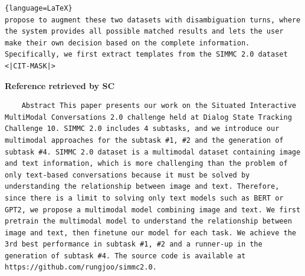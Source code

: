 \begin{lstlisting}{language=LaTeX}
propose to augment these two datasets with disambiguation turns, where the system provides all possible matched results and lets the user make their own decision based on the complete information. Specifically, we first extract templates from the SIMMC 2.0 dataset <|CIT-MASK|>
\end{lstlisting}

\textbf{Reference retrieved by SC}
\begin{lstlisting}
    Abstract This paper presents our work on the Situated Interactive MultiModal Conversations 2.0 challenge held at Dialog State Tracking Challenge 10. SIMMC 2.0 includes 4 subtasks, and we introduce our multimodal approaches for the subtask #1, #2 and the generation of subtask #4. SIMMC 2.0 dataset is a multimodal dataset containing image and text information, which is more challenging than the problem of only text-based conversations because it must be solved by understanding the relationship between image and text. Therefore, since there is a limit to solving only text models such as BERT or GPT2, we propose a multimodal model combining image and text. We first pretrain the multimodal model to understand the relationship between image and text, then finetune our model for each task. We achieve the 3rd best performance in subtask #1, #2 and a runner-up in the generation of subtask #4. The source code is available at https://github.com/rungjoo/simmc2.0.
\end{lstlisting}

